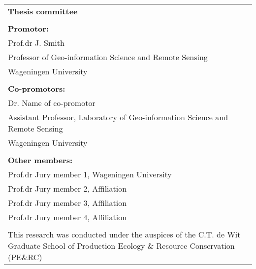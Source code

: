 \begin{tabular}{@{}p{\textwidth}}
    \textbf{Thesis committee}                                                                 \\  
                                                                                              \\  
    \textbf{Promotor:}                                                                        \\  
    Prof.dr J. Smith                                                                          \\  
    Professor of Geo-information Science and Remote Sensing                                   \\  
    Wageningen University                                                                     \\  
                                                                                              \\  
    \textbf{Co-promotors:}                                                                    \\  
    Dr. Name of co-promotor                                                                   \\  
    Assistant Professor, Laboratory of Geo-information Science and Remote Sensing             \\  
    Wageningen University                                                                     \\  
                                                                                              \\  

    \textbf{Other members:}                                                                   \\  
    Prof.dr Jury member 1, Wageningen University                                              \\  
    Prof.dr Jury member 2, Affiliation                                                        \\  
    Prof.dr Jury member 3, Affiliation                                                        \\  
    Prof.dr Jury member 4, Affiliation                                                        \\  
                                                                                              \\  
    \small{This research was conducted under the auspices of the C.T. de Wit Graduate School
    of Production Ecology \& Resource Conservation (PE$\&$RC)}                                  
\end{tabular}

